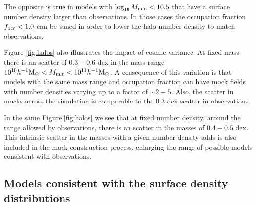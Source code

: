 \documentclass[usenatbib]{mn2e}
\newcommand{\hMsun}{{\ifmmode{h^{-1}{\rm
        {M_{\odot}}}}\else{$h^{-1}{\rm{M_{\odot}}}$}\fi}}
\begin{document}
The opposite is true in models with $\log_{10} M_{\rm min}<10.5$ that
have a surface number density larger than observations. In those cases
the occupation fraction $f_{\rm occ}<1.0$ can be tuned in order to
lower the halo number density to match observations.


Figure \ref{fig:halos} also illustrates the impact of cosmic
variance. At fixed mass there is an scatter of $0.3-0.6$ dex in the
mass range $10^{10}\hMsun < M_{\rm  min}<10^{11}\hMsun$.  A consequence of
this variation is that models with the same mass range and occupation
fraction can have mock fields with number densities varying up to a
factor of $\sim 2-5$. Also, the scatter in mocks across the simulation
is comparable to the $0.3$ dex scatter in observations.  


In the same Figure \ref{fig:halos} we see that at fixed number
density, around the range allowed by observations, there is an scatter
in the masses of $0.4-0.5$ dex. This intrinsic scatter in the masses
with a given number density adds is also included in the mock
construction process, enlarging the range of possible models
consistent with observations.  

\subsection{Models consistent with the surface density distributions}
\end{document}
